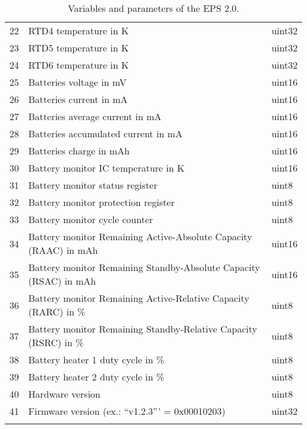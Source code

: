 \begin{longtable}[c]{cL{0.82\textwidth}l}
    22  & RTD4 temperature in K                                             & uint32 \\
    23  & RTD5 temperature in K                                             & uint32 \\
    24  & RTD6 temperature in K                                             & uint32 \\
    25  & Batteries voltage in mV                                           & uint16 \\
    26  & Batteries current in mA                                           & uint16 \\
    27  & Batteries average current in mA                                   & uint16 \\
    28  & Batteries accumulated current in mA                               & uint16 \\
    29  & Batteries charge in mAh                                           & uint16 \\
    30  & Battery monitor IC temperature in K                               & uint16 \\
    31  & Battery monitor status register                                   & uint8 \\
    32  & Battery monitor protection register                               & uint8 \\
    33  & Battery monitor cycle counter                                     & uint8 \\
    34  & Battery monitor Remaining Active-Absolute Capacity (RAAC) in mAh  & uint16 \\
    35  & Battery monitor Remaining Standby-Absolute Capacity (RSAC) in mAh & uint16 \\
    36  & Battery monitor Remaining Active-Relative Capacity (RARC) in \%   & uint8 \\
    37  & Battery monitor Remaining Standby-Relative Capacity (RSRC) in \%  & uint8 \\
    38  & Battery heater 1 duty cycle in \%                                 & uint8 \\
    39  & Battery heater 2 duty cycle in \%                                 & uint8 \\
    40  & Hardware version                                                  & uint8 \\
    41  & Firmware version (ex.: ``v1.2.3''' = 0x00010203)                  & uint32 \\
    \bottomrule[1.5pt]
    \caption{Variables and parameters of the EPS 2.0.}
    \label{tab:eps2-variables}
\end{longtable}

